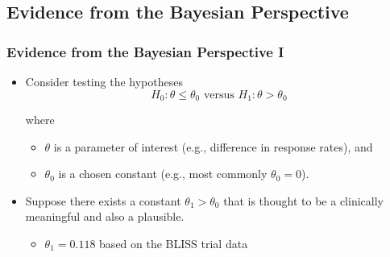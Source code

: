 \documentclass{beamer}
\begin{document}
\subsection{Evidence from the Bayesian Perspective}
\begin{frame} \frametitle{Evidence from the Bayesian Perspective I}
	\begin{itemize}
		\item Consider testing the hypotheses 
					\vspace{-0.2cm}
					\[ H_0: \theta \le \theta_0 \text{ versus } H_1: \theta > \theta_0 \]
					
					\vspace{-0.3cm}
					where 
					\begin{itemize}
					  \vspace{0.15cm}
						\item $\theta$ is a parameter of interest (e.g., difference in response rates), and
						
						\vspace{0.25cm}
						\item $\theta_0$ is a chosen constant (e.g., most commonly $\theta_0=0$).
					\end{itemize}
					
		\vspace{0.25cm}			
		\item Suppose there exists a constant $\theta_1 > \theta_0$ that is thought 
					to be a clinically meaningful and also a plausible.
					\begin{itemize}				
						\vspace{0.25cm}
						\item $\theta_1 = 0.118$ based on the BLISS trial data
					\end{itemize}							
					
					
					
		
  \end{itemize}
\end{frame}
%
%
%
\end{document}
